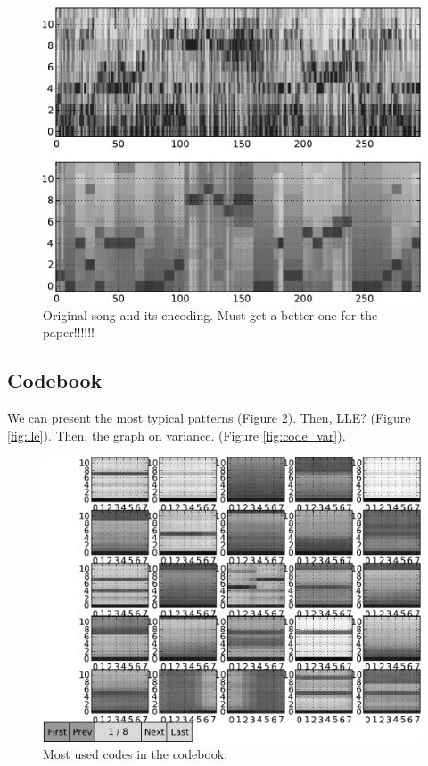\documentclass{article}
\begin{document}
\begin{figure}[htb]
\begin{center}
\includegraphics[width=.9\columnwidth]{song_encoded}
\end{center}
\caption{\small{Original song and its encoding. Must get a better one for
the paper!!!!!!}}
\label{fig:encodesong}
\end{figure}

\subsection{Codebook}
We can present the most typical patterns (Figure \ref{fig:codes1}). 
Then, LLE? (Figure \ref{fig:lle}). 
Then, the graph on variance. (Figure \ref{fig:code_var}).

\begin{figure}[htb]
\begin{center}
\includegraphics[width=.9\columnwidth]{codes1}
\end{center}
\caption{\small{Most used codes in the codebook.}}
\label{fig:codes1}
\end{figure}
\end{document}
